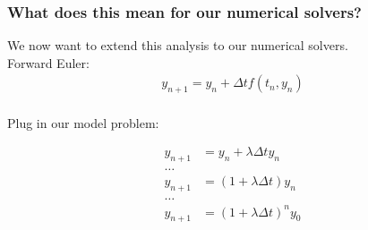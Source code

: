 \documentclass{beamer}
\begin{document}
\begin{frame}
\frametitle{What does this mean for our numerical solvers?} 

We now want to extend this analysis to our numerical solvers. \\

Forward Euler:
\begin{align*}
y_{n+1} = y_n + \Delta t f(t_n,y_n)
\end{align*}
\ \\

Plug in our model problem: 

\begin{align*}
y_{n+1} &= y_n + \lambda\Delta t y_n\\
\hdots\\
y_{n+1} &= (1+\lambda\Delta t)y_n\\
\hdots\\
y_{n+1} &= (1+\lambda\Delta t)^n y_0
\end{align*}

\end{frame}

\end{document}
